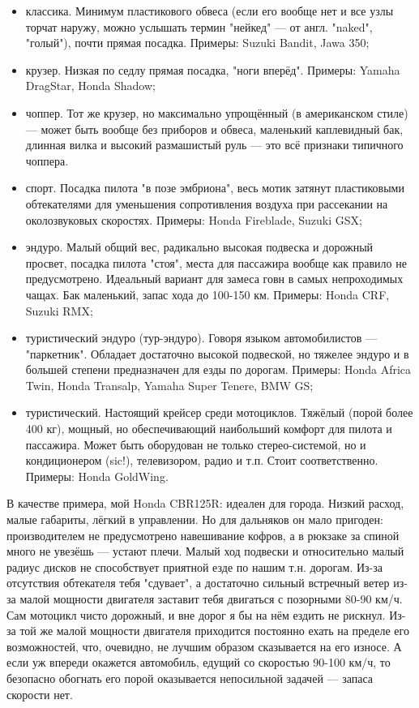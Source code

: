 \documentclass[12pt,a4paper]{article}
\begin{document}
\begin{itemize}
\item классика. Минимум пластикового обвеса (если его вообще нет и все
узлы торчат наружу, можно услышать термин "нейкед" --- от англ. "naked",
"голый"), почти прямая посадка. Примеры: Suzuki Bandit, Jawa 350;
\item крузер. Низкая по седлу прямая посадка, "ноги вперёд". Примеры:
Yamaha DragStar, Honda Shadow;
\item чоппер. Тот же крузер, но максимально упрощённый (в американском
стиле) --- может быть вообще без приборов и обвеса, маленький каплевидный
бак, длинная вилка и высокий размашистый руль --- это всё признаки
типичного чоппера.
\item спорт. Посадка пилота "в позе эмбриона", весь мотик затянут
пластиковыми обтекателями для уменьшения сопротивления воздуха при
рассекании на околозвуковых скоростях. Примеры: Honda Fireblade,
Suzuki GSX;
\item эндуро. Малый общий вес, радикально высокая подвеска и дорожный
просвет, посадка пилота "стоя", места для пассажира вообще как
правило не предусмотрено. Идеальный вариант для замеса говн в самых
непроходимых чащах. Бак маленький, запас хода до 100-150 км. Примеры:
Honda CRF, Suzuki RMX;
\item туристический эндуро (тур-эндуро). Говоря языком автомобилистов ---
"паркетник". Обладает достаточно высокой подвеской, но тяжелее эндуро
и в большей степени предназначен для езды по дорогам. Примеры: Honda
Africa Twin, Honda Transalp, Yamaha Super Tenere, BMW GS;
\item туристический. Настоящий крейсер среди мотоциклов. Тяжёлый (порой
более 400 кг), мощный, но обеспечивающий наибольший комфорт для
пилота и пассажира. Может быть оборудован не только стерео-системой,
но и кондиционером (sic!), телевизором, радио и т.п. Стоит
соответственно. Примеры: Honda GoldWing.
\end{itemize}

В качестве примера, мой Honda CBR125R: идеален для города. Низкий
расход, малые габариты, лёгкий в управлении. Но для дальняков он мало
пригоден: производителем не предусмотрено навешивание кофров, а в
рюкзаке за спиной много не увезёшь --- устают плечи. Малый ход подвески
и относительно малый радиус дисков не способствует приятной езде по
нашим т.н. дорогам. Из-за отсутствия обтекателя тебя "сдувает", а
достаточно сильный встречный ветер из-за малой мощности двигателя
заставит тебя двигаться с позорными 80-90 км/ч. Сам мотоцикл чисто
дорожный, и вне дорог я бы на нём ездить не рискнул.
Из-за той же малой мощности двигателя приходится постоянно ехать на
пределе его возможностей, что, очевидно, не лучшим образом
сказывается на его износе. А если уж впереди окажется автомобиль,
едущий со скоростью 90-100 км/ч, то безопасно обогнать его порой
оказывается непосильной задачей --- запаса скорости нет.
\end{document}
